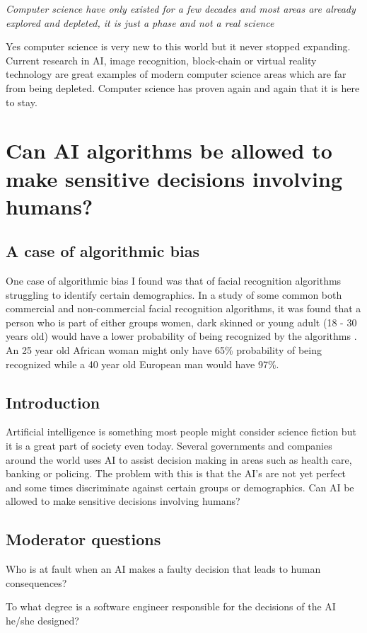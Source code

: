 \documentclass[11pt,a4paper]{article}
\begin{document}
\textit{Computer science have only existed for a few decades and most areas are already explored and depleted, it is just a phase and not a real science}

Yes computer science is very new to this world but it never stopped expanding. Current research in AI, image recognition, block-chain or
virtual reality technology are great examples of modern computer science areas which are far from being depleted. Computer science has proven
again and again that it is here to stay.  

\section{Can AI algorithms be allowed to make sensitive decisions involving humans?}
\subsection{A case of algorithmic bias}
One case of algorithmic bias I found was that of facial recognition algorithms struggling to identify certain demographics.
In a study of some common both commercial and non-commercial facial recognition algorithms, it was found that a person who
is part of either groups women, dark skinned or young adult (18 - 30 years old) would have a lower probability of being
recognized by the algorithms \cite{ai-bias}. An 25 year old African woman might only have 65\% probability of being recognized
while a 40 year old European man would have 97\%.   

\subsection{Introduction}
Artificial intelligence is something most people might consider science fiction but it is a great part of society even today.
Several governments and companies around the world uses AI to assist decision making in areas such as health care, banking or policing.
The problem with this is that the AI's are not yet perfect and some times discriminate against certain groups or demographics.
Can AI be allowed to make sensitive decisions involving humans?

\subsection{Moderator questions}
Who is at fault when an AI makes a faulty decision that leads to human consequences?

To what degree is a software engineer responsible for the decisions of the AI he/she designed?
\end{document}
